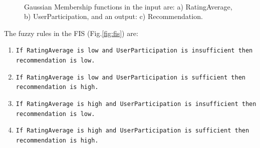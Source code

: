 \begin{figure}[ht!]
   \centering
   \hspace{0.1\linewidth}
   \\[20pt]
   \caption{Gaussian Membership functions in the input are: a) RatingAverage, 
   b) UserParticipation, and an output: c) Recommendation.}
   \label{fig:mffis} 
\end{figure}

The fuzzy rules in the FIS (Fig.\ref{fig:fis}) are:
\begin{enumerate} 
\item \texttt{If RatingAverage is low and UserParticipation is  insufficient then recommendation is low.}
\item \texttt{If RatingAverage is low and UserParticipation is  sufficient   then recommendation is high.} 
\item \texttt{If RatingAverage is high and UserParticipation is insufficient then recommendation is low.}
\item \texttt{If RatingAverage is high and UserParticipation is sufficient   then recommendation is high.}
\end{enumerate} 


